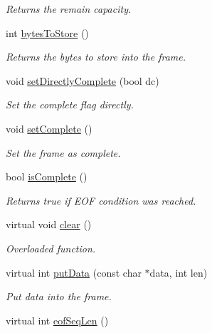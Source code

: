 \begin{DoxyCompactItemize}
\begin{DoxyCompactList}\small\item\em Returns the remain capacity. \end{DoxyCompactList}\item 
int \hyperlink{classmdt_frame_a8526b227a56562fddf8445060e8095d4}{bytesToStore} ()
\begin{DoxyCompactList}\small\item\em Returns the bytes to store into the frame. \end{DoxyCompactList}\item 
void \hyperlink{classmdt_frame_abfd6de396626f01ebf972b7d6cd26957}{setDirectlyComplete} (bool dc)
\begin{DoxyCompactList}\small\item\em Set the complete flag directly. \end{DoxyCompactList}\item 
void \hyperlink{classmdt_frame_ab8db9882c095091109115afb8e448b37}{setComplete} ()
\begin{DoxyCompactList}\small\item\em Set the frame as complete. \end{DoxyCompactList}\item 
\hypertarget{classmdt_frame_a2a8fb9f36c941282881bba0c538d1ce5}{
bool \hyperlink{classmdt_frame_a2a8fb9f36c941282881bba0c538d1ce5}{isComplete} ()}
\label{classmdt_frame_a2a8fb9f36c941282881bba0c538d1ce5}

\begin{DoxyCompactList}\small\item\em Returns true if EOF condition was reached. \end{DoxyCompactList}\item 
virtual void \hyperlink{classmdt_frame_acdf8a921a3f36ca91af88b55b90febdc}{clear} ()
\begin{DoxyCompactList}\small\item\em Overloaded function. \end{DoxyCompactList}\item 
virtual int \hyperlink{classmdt_frame_ae63af784d2fc54430ea5db4dc80b7ec8}{putData} (const char $\ast$data, int len)
\begin{DoxyCompactList}\small\item\em Put data into the frame. \end{DoxyCompactList}\item 
\hypertarget{classmdt_frame_a0e0dcfb9d284ac0dae550db33f0fbece}{
virtual int \hyperlink{classmdt_frame_a0e0dcfb9d284ac0dae550db33f0fbece}{eofSeqLen} ()}
\label{classmdt_frame_a0e0dcfb9d284ac0dae550db33f0fbece}


\end{DoxyCompactItemize}
